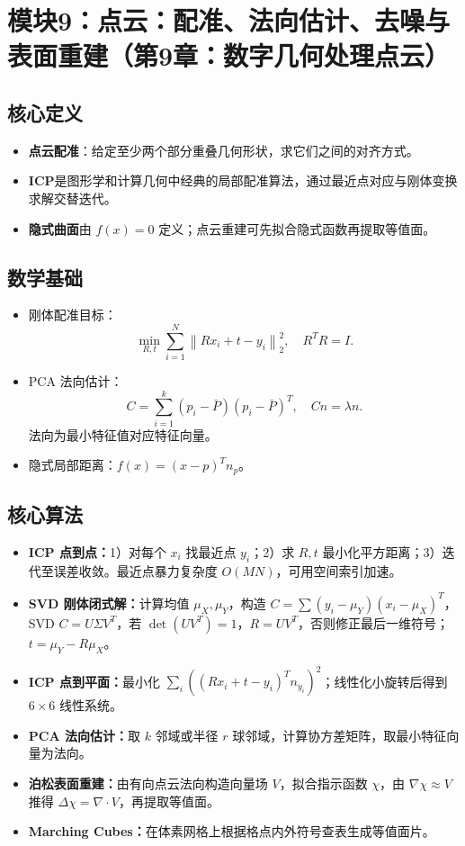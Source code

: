\documentclass[UTF8,fontset=fandol,11pt]{ctexart}
\newcommand{\key}[1]{\textbf{#1}}
\newcommand{\norm}[1]{\left\lVert #1 \right\rVert}
\begin{document}
\section{模块9：点云：配准、法向估计、去噪与表面重建（第9章：数字几何处理点云）}
\subsection{核心定义}
\begin{itemize}
  \item \key{点云配准}：给定至少两个部分重叠几何形状，求它们之间的对齐方式。
  \item \key{ICP}是图形学和计算几何中经典的局部配准算法，通过最近点对应与刚体变换求解交替迭代。
  \item \key{隐式曲面}由 $f(x)=0$ 定义；点云重建可先拟合隐式函数再提取等值面。
\end{itemize}
\subsection{数学基础}
\begin{itemize}
  \item 刚体配准目标：
  \[
    \min_{R,t}\sum_{i=1}^{N}\norm{Rx_i+t-y_i}_2^2,\quad R^TR=I.
  \]
  \item PCA 法向估计：
  \[
    C=\sum_{i=1}^{k}(p_i-\bar P)(p_i-\bar P)^T,\quad Cn=\lambda n.
  \]
  法向为最小特征值对应特征向量。
  \item 隐式局部距离：$f(x)=(x-p)^Tn_p$。
\end{itemize}
\subsection{核心算法}
\begin{itemize}
  \item \key{ICP 点到点：}1）对每个 $x_i$ 找最近点 $y_i$；2）求 $R,t$ 最小化平方距离；3）迭代至误差收敛。最近点暴力复杂度 $O(MN)$，可用空间索引加速。
  \item \key{SVD 刚体闭式解：}计算均值 $\mu_X,\mu_Y$，构造 $C=\sum(y_i-\mu_Y)(x_i-\mu_X)^T$，SVD $C=U\Sigma V^T$，若 $\det(UV^T)=1$，$R=UV^T$，否则修正最后一维符号；$t=\mu_Y-R\mu_X$。
  \item \key{ICP 点到平面：}最小化 $\sum_i((Rx_i+t-y_i)^Tn_{y_i})^2$；线性化小旋转后得到 $6\times6$ 线性系统。
  \item \key{PCA 法向估计：}取 $k$ 邻域或半径 $r$ 球邻域，计算协方差矩阵，取最小特征向量为法向。
  \item \key{泊松表面重建：}由有向点云法向构造向量场 $V$，拟合指示函数 $\chi$，由 $\nabla\chi\approx V$ 推得 $\Delta\chi=\nabla\cdot V$，再提取等值面。
  \item \key{Marching Cubes：}在体素网格上根据格点内外符号查表生成等值面片。
\end{itemize}
\end{document}
